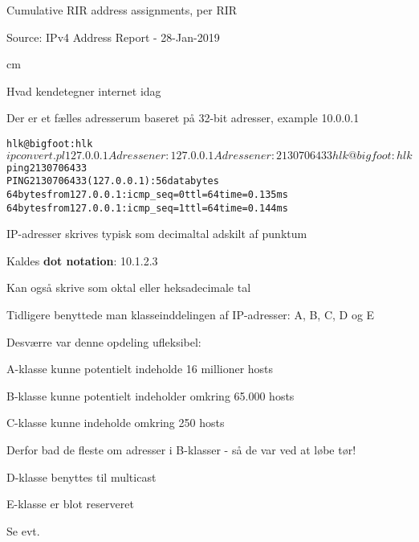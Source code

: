 \documentclass[Screen16to9,17pt]{foils}
\begin{document}

\centerline{Cumulative RIR address assignments, per RIR}

\begin{list1}
\item Source:
IPv4 Address Report - 28-Jan-2019
\end{list1}


 cm

\begin{list1}
\item Hvad kendetegner internet idag
\item Der er et fælles adresserum baseret på 32-bit adresser, example 10.0.0.1
\end{list1}


\begin{alltt}
hlk@bigfoot:hlk$ ipconvert.pl 127.0.0.1
Adressen er: 127.0.0.1
Adressen er: 2130706433
hlk@bigfoot:hlk$ ping 2130706433
PING 2130706433 (127.0.0.1): 56 data bytes
64 bytes from 127.0.0.1: icmp_seq=0 ttl=64 time=0.135 ms
64 bytes from 127.0.0.1: icmp_seq=1 ttl=64 time=0.144 ms
\end{alltt}

\begin{list1}
\item IP-adresser skrives typisk som decimaltal adskilt af punktum
\item Kaldes {\bf dot notation}: 10.1.2.3
\item Kan også skrive som oktal eller heksadecimale tal
\end{list1}



\begin{list1}
\item Tidligere benyttede man klasseinddelingen af IP-adresser: A, B, C, D og E
\item Desværre var denne opdeling ufleksibel:
\begin{list2}
\item A-klasse kunne potentielt indeholde 16 millioner hosts
\item B-klasse kunne potentielt indeholder omkring 65.000 hosts
\item C-klasse kunne indeholde omkring 250 hosts
\end{list2}
\item Derfor bad de fleste om adresser i B-klasser - så de var ved at løbe tør!
\item D-klasse benyttes til multicast
\item E-klasse er blot reserveret
\item Se evt. 
\end{list1}
\end{document}
